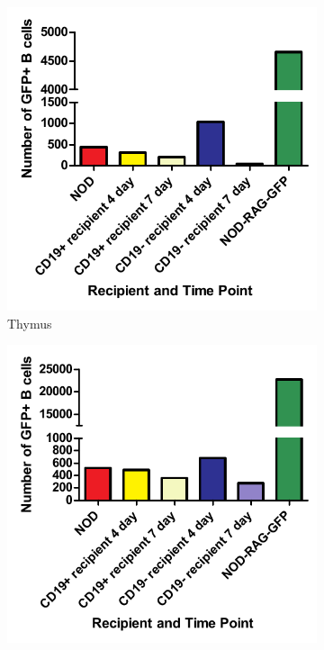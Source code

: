\begin{figure}
	\begin{subfigure}{0.45\textwidth}
	\includegraphics[width=\textwidth]{Figures/ThyGFPBcells.pdf}
	\caption{Thymus}
	\label{subfig:ThyGFPBcells}
	\end{subfigure}
	\begin{subfigure}{0.45\textwidth}
	\includegraphics[width=\textwidth]{Figures/BMGFPBcells.pdf}

\end{subfigure}
\end{figure}
